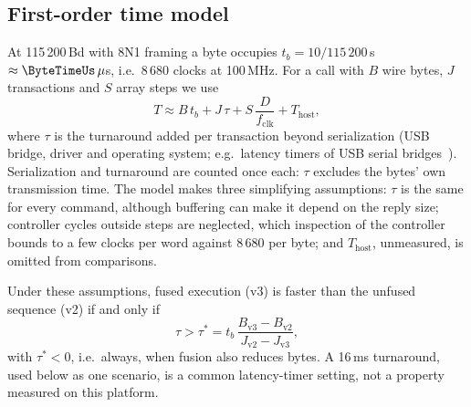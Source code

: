 \subsection{First-order time model}
\label{sec:latency}

At 115\,200\,Bd with 8N1 framing a byte occupies $t_b=10/115\,200$\,s
$\approx\ByteTimeUs\,\mu$s, i.e.\ 8\,680 clocks at 100\,MHz. For a call
with $B$ wire bytes, $J$ transactions and $S$ array steps we use
\begin{equation}
  T\approx B\,t_b+J\,\tau+S\,\frac{D}{f_{\mathrm{clk}}}+T_{\mathrm{host}},
  \label{eq:time}
\end{equation}
where $\tau$ is the turnaround added per transaction beyond serialization
(USB bridge, driver and operating system; e.g.\ latency timers of USB
serial bridges~\cite{ftdi-latency}). Serialization and turnaround are
counted once each: $\tau$ excludes the bytes' own transmission time. The
model makes three simplifying assumptions: $\tau$ is the same for every
command, although buffering can make it depend on the reply size; controller
cycles outside steps are neglected, which inspection of the controller
bounds to a few clocks per word against 8\,680 per byte; and
$T_{\mathrm{host}}$, unmeasured, is omitted from comparisons.

Under these assumptions, fused execution (v3) is faster than the unfused
sequence (v2) if and only if
\begin{equation}
  \tau>\tau^{*}=t_b\,\frac{B_{\mathrm{v3}}-B_{\mathrm{v2}}}{J_{\mathrm{v2}}-J_{\mathrm{v3}}},
  \label{eq:breakeven}
\end{equation}
with $\tau^{*}<0$, i.e.\ always, when fusion also reduces bytes. A 16\,ms
turnaround, used below as one scenario, is a common latency-timer setting,
not a property measured on this platform.

